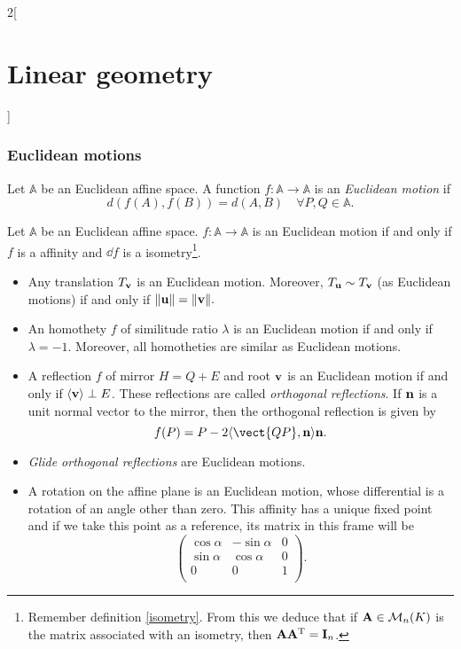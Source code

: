 \documentclass[../../../main.tex]{subfiles}
\begin{document}
\begin{multicols}{2}[\section{Linear geometry}]
  \subsubsection{Euclidean motions}
  \label{LG-euclidean_motion}
  \begin{definition}
    Let $\mathbb{A}$ be an Euclidean affine space. A function $f:\mathbb{A}\rightarrow\mathbb{A}$ is an \textit{Euclidean motion} if $$d(f(A),f(B))=d(A,B)\quad\forall P,Q\in\mathbb{A}.$$
  \end{definition}
  \begin{prop}
    Let $\mathbb{A}$ be an Euclidean affine space. $f:\mathbb{A}\rightarrow\mathbb{A}$ is an Euclidean motion if and only if $f$ is a affinity and $\dd f$ is a isometry\footnote{Remember definition \ref{isometry}. From this we deduce that if $\boldsymbol{\mathrm{A}}\in\mathcal{M}_n(K)$ is the matrix associated with an isometry, then $\boldsymbol{\mathrm{A}}\vb{A}^{\mathrm{T}}=\boldsymbol{\mathrm{I}}_n$.}.
  \end{prop}
  \begin{prop}
    \hfill
    \begin{itemize}
      \item Any translation $T_{\boldsymbol{\mathrm{v}}}$ is an Euclidean motion. Moreover, $T_{\boldsymbol{\mathrm{u}}}\sim T_{\boldsymbol{\mathrm{v}}}$ (as Euclidean motions) if and only if $\|\boldsymbol{\mathrm{u}}\|=\|\boldsymbol{\mathrm{v}}\|.$
      \item An homothety $f$ of similitude ratio $\lambda$ is an Euclidean motion if and only if $\lambda=-1$. Moreover, all homotheties are similar as Euclidean motions.
      \item A reflection $f$ of mirror $H=Q+E$ and root $\boldsymbol{\mathrm{v}}$ is an Euclidean motion if and only if $\langle\boldsymbol{\mathrm{v}}\rangle\perp E$. These reflections are called \textit{orthogonal reflections}. If $\boldsymbol{\mathrm{n}}$ is a unit normal vector to the mirror, then the orthogonal reflection is given by $$f(P)=P-2\langle\vect{QP},\vectorfunction{n}\rangle\vectorfunction{n}.$$
      \item \textit{Glide orthogonal reflections} are Euclidean motions.
      \item A rotation on the affine plane is an Euclidean motion, whose differential is a rotation of an angle other than zero. This affinity has a unique fixed point and if we take this point as a reference, its matrix in this frame will be $$\begin{pmatrix}
                \cos\alpha & -\sin\alpha & 0 \\
                \sin\alpha & \cos\alpha  & 0 \\
                0          & 0           & 1 \\
              \end{pmatrix}.$$
    \end{itemize}
  \end{prop}

\end{multicols}
\end{document}
